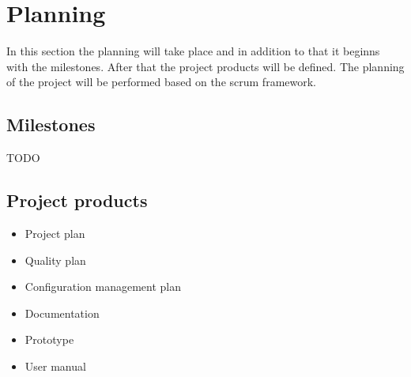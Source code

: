 \section{Planning}
In this section the planning will take place and in addition to that it beginns with the milestones.
After that the project products will be defined. The planning of the project will be performed based on the  scrum framework.

    \subsection{Milestones}
    TODO

    \subsection{Project products}
    \begin{itemize}
        \item Project plan
        \item Quality plan
        \item Configuration management plan
        \item Documentation
        \item Prototype
        \item User manual
    \end{itemize}